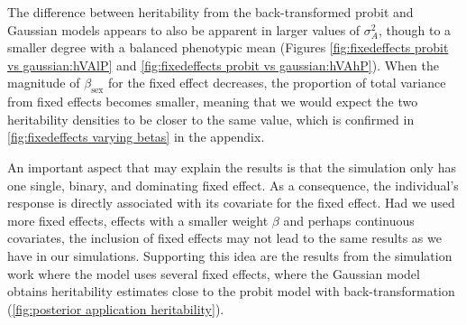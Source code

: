 The difference between heritability from the back-transformed probit and Gaussian models appears to also be apparent in larger values of $\sigma^2_A$, though to a smaller degree with a balanced phenotypic mean (Figures \ref{fig:fixedeffects probit vs gaussian:hVAlP} and \ref{fig:fixedeffects probit vs gaussian:hVAhP}). When the magnitude of $\beta_\text{sex}$ for the fixed effect decreases, the proportion of total variance from fixed effects becomes smaller, meaning that we would expect the two heritability densities to be closer to the same value, which is confirmed in \autoref{fig:fixedeffects varying betas} in the appendix.

An important aspect that may explain the results is that the simulation only has one single, binary, and dominating fixed effect. As a consequence, the individual's response is directly associated with its covariate for the fixed effect. Had we used more fixed effects, effects with a smaller weight $\beta$ and perhaps continuous covariates, the inclusion of fixed effects may not lead to the same results as we have in our simulations. Supporting this idea are the results from the simulation work where the model uses several fixed effects, where the Gaussian model obtains heritability estimates close to the probit model with back-transformation (\autoref{fig:posterior application heritability}).



